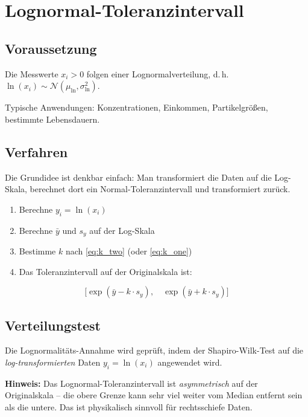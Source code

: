\documentclass[10pt,a4paper,twocolumn]{article}
\theoremstyle{definition}
\newcommand{\hinweis}[1]{%
    \begin{center}
    \colorbox{noteblue}{\parbox{0.92\linewidth}{\small\textbf{Hinweis:} #1}}
    \end{center}
}
\newcommand{\TI}{Toleranzintervall}
\begin{document}
\section{Lognormal-Toleranzintervall}
\label{sec:lognormal}

\subsection{Voraussetzung}

Die Messwerte $x_i > 0$ folgen einer Lognormalverteilung, d.\,h.\
$\ln(x_i) \sim \mathcal{N}(\mu_{\ln}, \sigma_{\ln}^2)$.

Typische Anwendungen: Konzentrationen, Einkommen, Partikelgrößen,
bestimmte Lebensdauern.

\subsection{Verfahren}

Die Grundidee ist denkbar einfach: Man transformiert die Daten
auf die Log-Skala, berechnet dort ein Normal-\TI{} und
transformiert zurück.

\begin{enumerate}[nosep,leftmargin=*]
    \item Berechne $y_i = \ln(x_i)$
    \item Berechne $\bar{y}$ und $s_y$ auf der Log-Skala
    \item Bestimme $k$ nach \cref{eq:k_two} (oder \cref{eq:k_one})
    \item Das \TI{} auf der Originalskala ist:
\end{enumerate}

\begin{equation}
    \big[\exp(\bar{y} - k \cdot s_y), \quad
          \exp(\bar{y} + k \cdot s_y)\big]
    \label{eq:lognormal_ti}
\end{equation}

\subsection{Verteilungstest}

Die Lognormalitäts-Annahme wird geprüft, indem der Shapiro-Wilk-Test
auf die \emph{log-transformierten} Daten $y_i = \ln(x_i)$ angewendet
wird.

\hinweis{Das Lognormal-\TI{} ist \emph{asymmetrisch} auf der
Originalskala -- die obere Grenze kann sehr viel weiter vom Median
entfernt sein als die untere. Das ist physikalisch sinnvoll für
rechtsschiefe Daten.}
\end{document}
